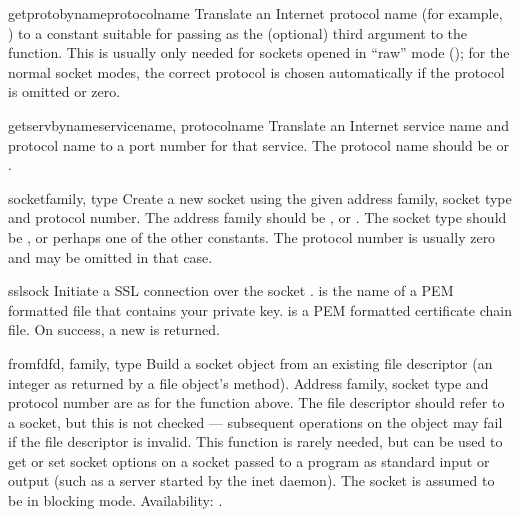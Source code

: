 \begin{funcdesc}{getprotobyname}{protocolname}
Translate an Internet protocol name (for example, ) to a constant
suitable for passing as the (optional) third argument to the
 function.  This is usually only needed for sockets
opened in ``raw'' mode (); for the normal socket
modes, the correct protocol is chosen automatically if the protocol is
omitted or zero.
\end{funcdesc}

\begin{funcdesc}{getservbyname}{servicename, protocolname}
Translate an Internet service name and protocol name to a port number
for that service.  The protocol name should be  or
.
\end{funcdesc}

\begin{funcdesc}{socket}{family, type}
Create a new socket using the given address family, socket type and
protocol number.  The address family should be ,  or
.  The socket type should be ,
 or perhaps one of the other  constants.
The protocol number is usually zero and may be omitted in that case.
\end{funcdesc}

\begin{funcdesc}{ssl}{sock}
Initiate a SSL connection over the socket .  is
the name of a PEM formatted file that contains your private
key.  is a PEM formatted certificate chain file. On
success, a new  is returned.

\end{funcdesc}

\begin{funcdesc}{fromfd}{fd, family, type}
Build a socket object from an existing file descriptor (an integer as
returned by a file object's  method).  Address family,
socket type and protocol number are as for the  function
above.  The file descriptor should refer to a socket, but this is not
checked --- subsequent operations on the object may fail if the file
descriptor is invalid.  This function is rarely needed, but can be
used to get or set socket options on a socket passed to a program as
standard input or output (such as a server started by the \UNIX{} inet
daemon).  The socket is assumed to be in blocking mode.
Availability: \UNIX.
\end{funcdesc}

